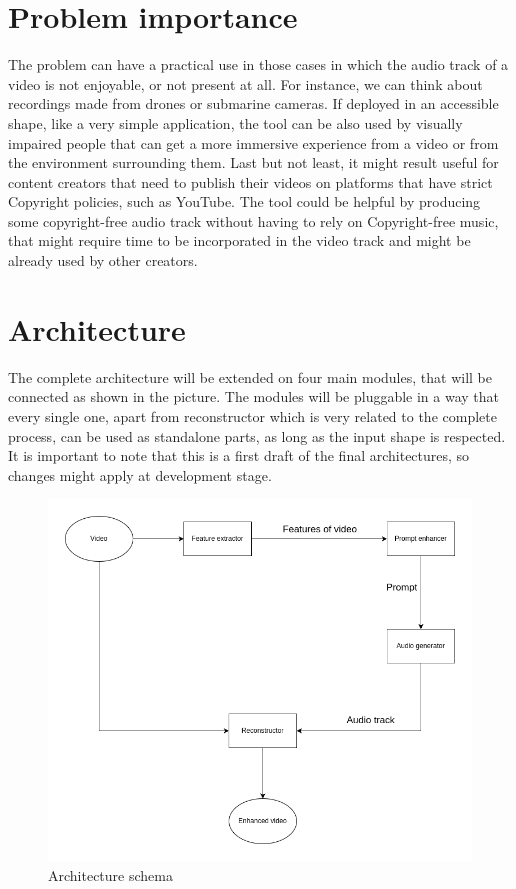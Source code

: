 \documentclass[conference]{IEEEtran}
\begin{document}
\section{Problem importance}
The problem can have a practical use in those cases in which the audio track of a video is not enjoyable, or not present at all. For instance, we can think about recordings made from drones or submarine cameras. If deployed in an accessible shape, like a very simple application, the tool can be also used by visually impaired people that can get a more immersive experience from a video or from the environment surrounding them. 
Last but not least, it might result useful for content creators that need to publish their videos on platforms that have strict Copyright policies, such as YouTube. The tool could be helpful by producing some copyright-free audio track without having to rely on Copyright-free music, that might require time to be incorporated in the video track and might be already used by other creators.

\section{Architecture}
The complete architecture will be extended on four main modules, that will be connected as shown in the picture. The modules will be pluggable in a way that every single one, apart from reconstructor which is very related to the complete process, can be used as standalone parts, as long as the input shape is respected.\\
It is important to note that this is a first draft of the final architectures, so changes might apply at development stage.

\begin{figure}
\includegraphics[width=\linewidth]{architecture.drawio.png}
\caption{Architecture schema}
\end{figure}
\end{document}
